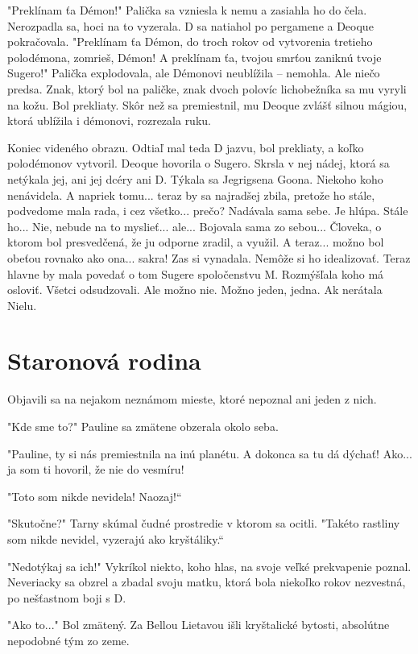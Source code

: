 \documentclass{book}
\begin{document}
"$ $Preklínam ťa Démon!"$ $ Palička sa vzniesla k nemu a zasiahla ho do čela. Nerozpadla sa, hoci na to vyzerala. D sa natiahol po pergamene a Deoque pokračovala. "$ $Preklínam ťa Démon, do troch rokov od vytvorenia tretieho polodémona, zomrieš, Démon! A preklínam ťa, tvojou smrťou zaniknú tvoje Sugero!"$ $ Palička explodovala, ale Démonovi neublížila – nemohla. Ale niečo predsa. Znak, ktorý bol na paličke, znak dvoch polovíc lichobežníka sa mu vyryli na kožu. Bol prekliaty. Skôr než sa premiestnil, mu Deoque zvlášť silnou mágiou, ktorá ublížila i démonovi, rozrezala ruku. 

Koniec videného obrazu. Odtiaľ mal teda D jazvu, bol prekliaty, a koľko polodémonov vytvoril. Deoque hovorila o Sugero. Skrsla v nej nádej, ktorá sa netýkala jej, ani jej dcéry ani D. Týkala sa Jegrigsena Goona. Niekoho koho nenávidela. A napriek tomu... teraz by sa najradšej zbila, pretože ho stále, podvedome mala rada, i cez všetko... prečo? Nadávala sama sebe. Je hlúpa. Stále ho... Nie, nebude na to myslieť... ale... Bojovala sama zo sebou... Človeka, o ktorom bol presvedčená, že ju odporne zradil, a využil. A teraz... možno bol obeťou rovnako ako ona... sakra! Zas si vynadala. Nemôže si ho idealizovať. Teraz hlavne by mala povedať o tom Sugere spoločenstvu M. Rozmýšľala koho má osloviť. Všetci odsudzovali. Ale možno nie. Možno jeden, jedna. Ak nerátala Nielu.


\chapter{Staronová rodina}

Objavili sa na nejakom neznámom mieste, ktoré nepoznal ani jeden z nich.

"$ $Kde sme to?"$ $ Pauline sa zmätene obzerala okolo seba.

"$ $Pauline, ty si nás premiestnila na inú planétu. A dokonca sa tu dá dýchať! Ako... ja som ti hovoril, že nie do vesmíru!

"$ $Toto som nikde nevidela! Naozaj!“

"$ $Skutočne?"$ $ Tarny skúmal čudné prostredie v ktorom sa ocitli. "$ $Takéto rastliny som nikde nevidel, vyzerajú ako kryštáliky.“

"$ $Nedotýkaj sa ich!"$ $ Vykríkol niekto, koho hlas, na svoje veľké prekvapenie poznal. Neveriacky sa obzrel a zbadal svoju matku, ktorá bola niekoľko rokov nezvestná, po nešťastnom boji s D.

"$ $Ako to..."$ $ Bol zmätený. Za Bellou Lietavou išli kryštalické bytosti, absolútne nepodobné tým zo zeme.
\end{document}
